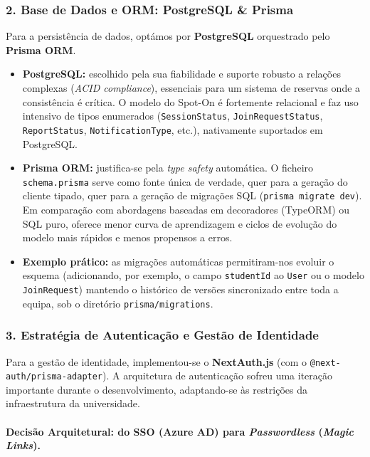 \documentclass[11pt,a4paper]{article}
\begin{document}
\subsubsection{2. Base de Dados e ORM: PostgreSQL \& Prisma}

Para a persistência de dados, optámos por \textbf{PostgreSQL} orquestrado pelo
\textbf{Prisma ORM}.

\begin{itemize}[leftmargin=*]
    \item \textbf{PostgreSQL:} escolhido pela sua fiabilidade e suporte robusto
          a relações complexas (\emph{ACID compliance}), essenciais para um sistema
          de reservas onde a consistência é crítica. O modelo do Spot-On é
          fortemente relacional e faz uso intensivo de tipos enumerados
          (\texttt{SessionStatus}, \texttt{JoinRequestStatus},
          \texttt{ReportStatus}, \texttt{NotificationType}, etc.), nativamente
          suportados em PostgreSQL.
    \item \textbf{Prisma ORM:} justifica-se pela \emph{type safety} automática.
          O ficheiro \texttt{schema.prisma} serve como fonte única de verdade,
          quer para a geração do cliente tipado, quer para a geração de migrações
          SQL (\texttt{prisma migrate dev}). Em comparação com abordagens baseadas
          em decoradores (TypeORM) ou SQL puro, oferece menor curva de
          aprendizagem e ciclos de evolução do modelo mais rápidos e menos
          propensos a erros.
    \item \textbf{Exemplo prático:} as migrações automáticas permitiram-nos
          evoluir o esquema (adicionando, por exemplo, o campo \texttt{studentId}
          ao \texttt{User} ou o modelo \texttt{JoinRequest}) mantendo o histórico
          de versões sincronizado entre toda a equipa, sob o diretório
          \texttt{prisma/migrations}.
\end{itemize}

\subsubsection{3. Estratégia de Autenticação e Gestão de Identidade}

Para a gestão de identidade, implementou-se o \textbf{NextAuth.js} (com o
\texttt{@next-auth/prisma-adapter}). A arquitetura de autenticação sofreu uma
iteração importante durante o desenvolvimento, adaptando-se às restrições da
infraestrutura da universidade.

\paragraph{Decisão Arquitetural: do SSO (Azure AD) para \emph{Passwordless}
    (\emph{Magic Links}).}
\end{document}
